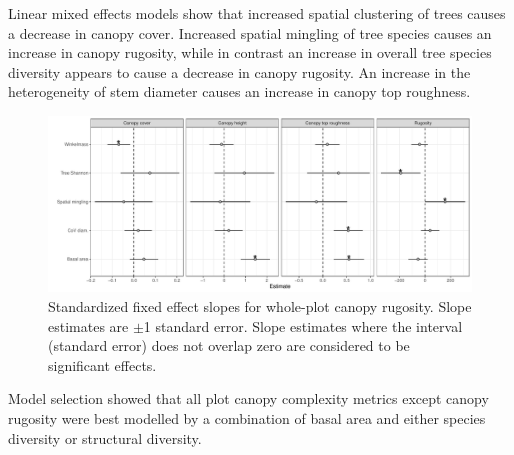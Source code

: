 \documentclass[11pt,a4paper]{article}
\begin{document}
Linear mixed effects models show that increased spatial clustering of trees causes a decrease in canopy cover. Increased spatial mingling of tree species causes an increase in canopy rugosity, while in contrast an increase in overall tree species diversity appears to cause a decrease in canopy rugosity. An increase in the heterogeneity of stem diameter causes an increase in canopy top roughness.

\begin{figure}[H]
\centering
	\includegraphics[width=\textwidth]{canopy_rough_slopes}
	\caption{Standardized fixed effect slopes for whole-plot canopy rugosity. Slope estimates are $\pm$1 standard error. Slope estimates where the interval (standard error) does not overlap zero are considered to be significant effects.}
	\label{canopy_rough_slopes}
\end{figure}

Model selection showed that all plot canopy complexity metrics except canopy rugosity were best modelled by a combination of basal area and either species diversity or structural diversity. 


\end{document}

